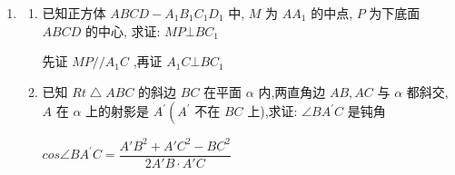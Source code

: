 \begin{enumerate}
\begin{enumerate}
        \begin{jieda}
            记 ${PB}$ 与 $\alpha$ 所成角为 $\theta  \in  \left( {0,\dfrac{\pi }{4}}\right)$ ,由题意, $\sin {2\theta } = \dfrac{PO}{PA}$ , $\sin \theta  = \dfrac{PO}{PB}$ , $\therefore \dfrac{\sin {2\theta }}{\sin \theta } = 2\cos \theta  = \dfrac{PB}{PA} = \dfrac{3}{2}$ , $\therefore \cos \theta  =$  $\dfrac{3}{4},\therefore \sin \theta  = \dfrac{\sqrt{7}}{4}$ .
        \end{jieda}
    \end{enumerate}
    \item 
    \begin{enumerate}
        \item 已知正方体 ${ABCD} - {A}_{1}{B}_{1}{C}_{1}{D}_{1}$ 中, $M$ 为 $A{A}_{1}$ 的中点, $P$ 为下底面 ${ABCD}$ 的中心, 求证: ${MP}\bot {B{C}_{1}}$
        \begin{jieda}
            先证 ${MP}//{A}_{1}C$ ,再证 ${A}_{1}C\bot B{C}_{1}$
        \end{jieda}
        \item 已知 ${{Rt}}\bigtriangleup {ABC}$ 的斜边 ${BC}$ 在平面 $\alpha$ 内,两直角边 ${AB},{AC}$ 与 $\alpha$ 都斜交, $A$ 在 $\alpha$ 上的射影是 ${A}^{\prime }\left( {A}^{\prime }\right.$ 不在 ${BC}$ 上),求证: $\angle B{A}^{\prime }C$ 是钝角
        \begin{jieda}
            $cos\angle{B{A}^{\prime }C} = \dfrac{A'B^2+A'C^2-BC^2}{2A'B \cdot A'C}$
    

\end{jieda}
\end{enumerate}
\end{enumerate}
